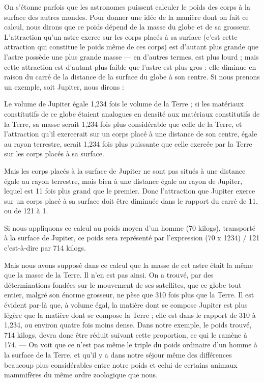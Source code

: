 \documentclass[a4paper, 11pt, oneside, landscape]{article}
\begin{document}
On s'étonne parfois que les astronomes puissent calculer le poids des corps à la surface des autres mondes. Pour donner une idée de la manière dont on fait ce calcul, nous dirons que ce poids dépend de la masse du globe et de sa grosseur. L'attraction qu'un astre exerce sur les corps placés à sa surface (c'est cette attraction qui constitue le poids même de ces corps) est d'autant plus grande que l'astre possède une plus grande masse --- en d'autres termes, est plus lourd ; mais cette attraction est d'autant plus faible que l'astre est plus gros : elle diminue en raison du carré de la distance de la surface du globe à son centre. Si nous prenons un exemple, soit Jupiter, nous dirons :

Le volume de Jupiter égale 1,234 fois le volume de la Terre ; si les matériaux constitutifs de ce globe étaient analogues en densité aux matériaux constitutifs de la Terre, sa masse serait 1,234 fois plus considérable que celle de la Terre, et l'attraction qu'il exercerait sur un corps placé à une distance de son centre, égale au rayon terrestre, serait 1,234 fois plus puissante que celle exercée par la Terre sur les corps placés à sa surface.

Mais les corps placés à la surface de Jupiter ne sont pas situés à une distance égale au rayon terrestre, mais bien à une distance égale au rayon de Jupiter, lequel est 11 fois plus grand que le premier. Donc l'attraction que Jupiter exerce sur un corps placé à sa surface doit être diminuée dans le rapport du carré de 11, ou de 121 à 1.

Si nous appliquons ce calcul au poids moyen d'un homme (70 kilogs), transporté à la surface de Jupiter, ce poids sera représenté par l'expression (70 x 1234) / 121 c'est-à-dire par 714 kilogs.

Mais nous avons supposé dans ce calcul que la masse de cet astre était la même que la masse de la Terre. Il n'en est pas ainsi. On a trouvé, par des déterminations fondées sur le mouvement de ses satellites, que ce globe tout entier, malgré son énorme grosseur, ne pèse que 310 fois plus que la Terre. Il est évident par-là que, à volume égal, la matière dont se compose Jupiter est plus légère que la matière dont se compose la Terre ; elle est dans le rapport de 310 à 1,234, ou environ quatre fois moins dense. Dans notre exemple, le poids trouvé, 714 kilogs, devra donc être réduit suivant cette proportion, ce qui le ramène à 174. --- On voit que ce n'est pas même le triple du poids ordinaire d'un homme à la surface de la Terre, et qu'il y a dans notre séjour même des différences beaucoup plus considérables entre notre poids et celui de certains animaux mammifères du même ordre zoologique que nous.
\end{document}
